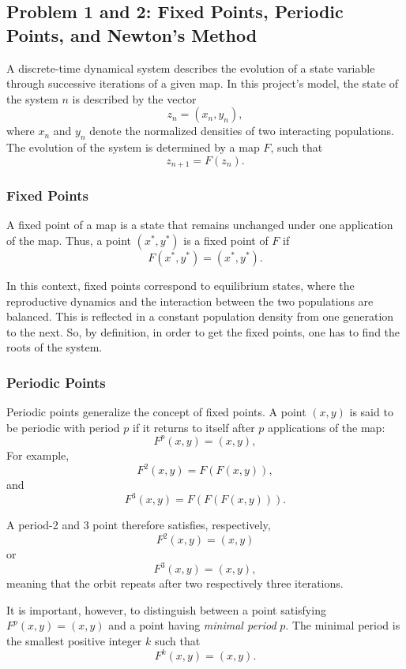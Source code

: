 \subsection{Problem 1 and 2: Fixed Points, Periodic Points, and Newton's Method}

A discrete-time dynamical system describes the evolution of a state variable through successive iterations of a given map. In this  project's model, the state of the system \(n\) is described by the vector
\[
z_n = (x_n,y_n),
\]
where \(x_n\) and \(y_n\) denote the normalized densities of two interacting populations. The evolution of the system is determined by a map \(F\), such that
\[
z_{n+1}=F(z_n).
\]



\subsubsection{Fixed Points}

A fixed point of a map is a state that remains unchanged under one application of the map. Thus, a point \((x^*,y^*)\) is a fixed point of \(F\) if
\[
F(x^*,y^*)=(x^*,y^*).
\]


In this context, fixed points correspond to equilibrium states, where the reproductive dynamics and the interaction between the two populations are balanced.
This is reflected in a constant population density from one generation to the next.
So, by definition, in order to get the fixed points, one has to find the roots of the system.

\subsubsection{Periodic Points}

Periodic points generalize the concept of fixed points. A point \((x,y)\) is said to be periodic with period \(p\) if it returns to itself after \(p\) applications of the map:
\[
F^p(x,y)=(x,y),
\]
For example,
\[
F^2(x,y)=F(F(x,y)),
\]
and
\[
F^3(x,y)=F(F(F(x,y))).
\]

A period-2 and 3 point therefore satisfies, respectively,
\[
F^2(x,y)=(x,y)
\]
or
\[
F^3(x,y)=(x,y),
\]
meaning that the orbit repeats after two respectively three iterations.

It is important, however, to distinguish between a point satisfying \(F^p(x,y)=(x,y)\) and a point having \emph{minimal period} \(p\). The minimal period is the smallest positive integer \(k\) such that
\[
F^k(x,y)=(x,y).
\]

